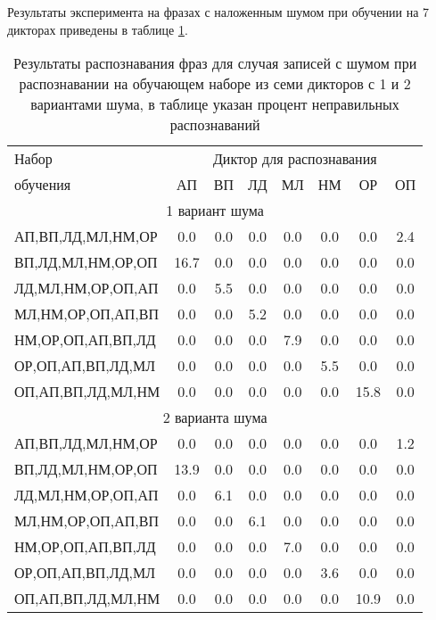 Результаты эксперимента на фразах с наложенным шумом при обучении на 7 дикторах приведены в таблице \ref{tab:cnn_phrases_7dictors_noises}.

\begin{table}[h]
	\centering
	\caption{Результаты распознавания фраз для случая записей с шумом при распознавании на обучающем наборе из семи дикторов с 1 и 2 вариантами шума, в таблице указан процент неправильных распознаваний}
	\label{tab:cnn_phrases_7dictors_noises}
	\begin{tabular}{| l | c | c | c | c | c | c | c |}
		\hline
		Набор & \multicolumn{7}{c|}{Диктор для распознавания} \\
		\hhline{~-------}
		обучения & \phantom{0}АП\phantom{0} & \phantom{0}ВП\phantom{0} & \phantom{0}ЛД\phantom{0} & \phantom{0}МЛ\phantom{0} & \phantom{0}НМ\phantom{0} & \phantom{0}ОР\phantom{0} & \phantom{0}ОП\phantom{0} \\
		\hline
		\multicolumn{8}{|c|}{1 вариант шума} \\
		\hline
		АП,ВП,ЛД,МЛ,НМ,ОР &  0.0 & 0.0 & 0.0 & 0.0 & 0.0 &  0.0 & 2.4 \\
		ВП,ЛД,МЛ,НМ,ОР,ОП & 16.7 & 0.0 & 0.0 & 0.0 & 0.0 &  0.0 & 0.0 \\
		ЛД,МЛ,НМ,ОР,ОП,АП &  0.0 & 5.5 & 0.0 & 0.0 & 0.0 &  0.0 & 0.0 \\
		МЛ,НМ,ОР,ОП,АП,ВП &  0.0 & 0.0 & 5.2 & 0.0 & 0.0 &  0.0 & 0.0 \\
		НМ,ОР,ОП,АП,ВП,ЛД &  0.0 & 0.0 & 0.0 & 7.9 & 0.0 &  0.0 & 0.0 \\
		ОР,ОП,АП,ВП,ЛД,МЛ &  0.0 & 0.0 & 0.0 & 0.0 & 5.5 &  0.0 & 0.0 \\
		ОП,АП,ВП,ЛД,МЛ,НМ &  0.0 & 0.0 & 0.0 & 0.0 & 0.0 & 15.8 & 0.0 \\
		\hline
		\multicolumn{8}{|c|}{2 варианта шума} \\
		\hline
		АП,ВП,ЛД,МЛ,НМ,ОР &  0.0 & 0.0 & 0.0 & 0.0 & 0.0 &  0.0 & 1.2 \\
		ВП,ЛД,МЛ,НМ,ОР,ОП & 13.9 & 0.0 & 0.0 & 0.0 & 0.0 &  0.0 & 0.0 \\
		ЛД,МЛ,НМ,ОР,ОП,АП &  0.0 & 6.1 & 0.0 & 0.0 & 0.0 &  0.0 & 0.0 \\
		МЛ,НМ,ОР,ОП,АП,ВП &  0.0 & 0.0 & 6.1 & 0.0 & 0.0 &  0.0 & 0.0 \\
		НМ,ОР,ОП,АП,ВП,ЛД &  0.0 & 0.0 & 0.0 & 7.0 & 0.0 &  0.0 & 0.0 \\
		ОР,ОП,АП,ВП,ЛД,МЛ &  0.0 & 0.0 & 0.0 & 0.0 & 3.6 &  0.0 & 0.0 \\
		ОП,АП,ВП,ЛД,МЛ,НМ &  0.0 & 0.0 & 0.0 & 0.0 & 0.0 & 10.9 & 0.0 \\
		\hline
	\end{tabular}
\end{table}

